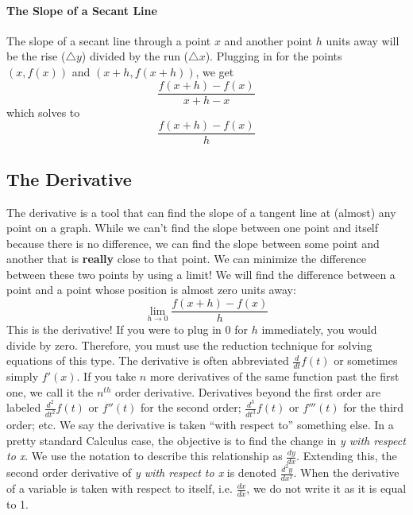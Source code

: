 \documentclass[../revisedmain.tex]{subfiles}
\begin{document}
	\paragraph{The Slope of a Secant Line} The slope of a secant line through a point $x$ and another point $h$ units away will be the rise ($\triangle y$) divided by the run ($\triangle x$). Plugging in for the points $(x,f(x))$ and $(x+h,f(x+h))$, we get $$\frac{f(x+h)-f(x)}{x+h-x}$$which solves to$$\frac{f(x+h)-f(x)}{h}$$
	\subsection{The Derivative}
	\par The derivative is a tool that can find the slope of a tangent line at (almost) any point on a graph. While we can't find the slope between one point and itself because there is no difference, we can find the slope between some point and another that is \textbf{really} close to that point. We can minimize the difference between these two points by using a limit! We will find the difference between a point and a point whose position is almost zero units away: $$\lim_{h\to 0} \frac{f(x+h)-f(x)}{h}$$ This is the derivative! If you were to plug in 0 for $h$ immediately, you would divide by zero. Therefore, you must use the reduction technique for solving equations of this type. The derivative is often abbreviated $\displaystyle\frac{d}{dt} f(t)$ or sometimes simply $f'(x)$. If you take $n$ more derivatives of the same function past the first one, we call it the $n^{th}$ order derivative. Derivatives beyond the first order are labeled $\displaystyle\frac{d^2}{dt^2} f(t)$ or $f''(t)$ for the second order; $\displaystyle\frac{d^3}{dt^3} f(t)$ or $f'''(t)$ for the third order; etc. We say the derivative is taken ``with respect to'' something else. In a pretty standard Calculus case, the objective is to find the change in  \textit{y with respect to x}. We use the notation to describe this relationship as $\displaystyle\frac{dy}{dx}$. Extending this, the second order derivative of \textit{y with respect to x} is denoted $\displaystyle\frac{d^2y}{dx^2}$. When the derivative of a variable is taken with respect to itself, i.e. $\displaystyle\frac{dx}{dx}$, we do not write it as it is equal to 1.\\
	\newline
\end{document}
